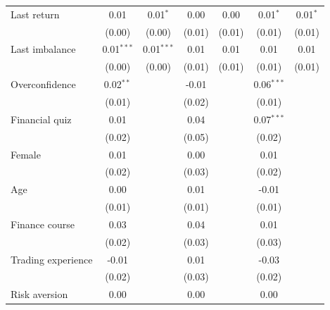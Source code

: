 \begin{tabular}{lcccccc}
   Last return                    & 0.01          & 0.01$^{*}$    & 0.00         & 0.00         & 0.01$^{*}$   & 0.01$^{*}$\\   
                                  & (0.00)        & (0.00)        & (0.01)       & (0.01)       & (0.01)       & (0.01)\\   
   Last imbalance                 & 0.01$^{***}$  & 0.01$^{***}$  & 0.01         & 0.01         & 0.01         & 0.01\\   
                                  & (0.00)        & (0.00)        & (0.01)       & (0.01)       & (0.01)       & (0.01)\\   
   Overconfidence                 & 0.02$^{**}$   &               & -0.01        &              & 0.06$^{***}$ &   \\   
                                  & (0.01)        &               & (0.02)       &              & (0.01)       &   \\   
   Financial quiz                 & 0.01          &               & 0.04         &              & 0.07$^{***}$ &   \\   
                                  & (0.02)        &               & (0.05)       &              & (0.02)       &   \\   
   Female                         & 0.01          &               & 0.00         &              & 0.01         &   \\   
                                  & (0.02)        &               & (0.03)       &              & (0.02)       &   \\   
   Age                            & 0.00          &               & 0.01         &              & -0.01        &   \\   
                                  & (0.01)        &               & (0.01)       &              & (0.01)       &   \\   
   Finance course                 & 0.03          &               & 0.04         &              & 0.01         &   \\   
                                  & (0.02)        &               & (0.03)       &              & (0.03)       &   \\   
   Trading experience             & -0.01         &               & 0.01         &              & -0.03        &   \\   
                                  & (0.02)        &               & (0.03)       &              & (0.02)       &   \\   
   Risk aversion                  & 0.00          &               & 0.00         &              & 0.00         &   \\   

\end{tabular}

